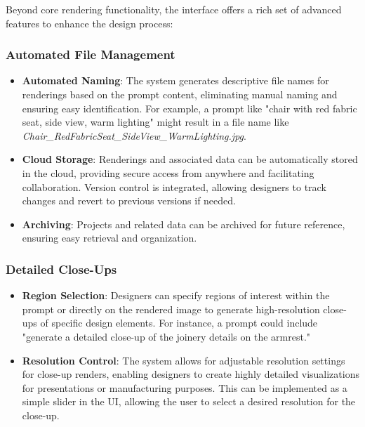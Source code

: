 \documentclass[12pt]{report}
\begin{document}
Beyond core rendering functionality, the interface offers a rich set of advanced features to enhance the design process:

\subsubsection{Automated File Management}
\begin{itemize}
\item \textbf{Automated Naming}: The system generates descriptive file names for renderings based on the prompt content, eliminating manual naming and ensuring easy identification. For example, a prompt like "chair with red fabric seat, side view, warm lighting" might result in a file name like \textit{Chair\_RedFabricSeat\_SideView\_WarmLighting.jpg}.
\item \textbf{Cloud Storage}: Renderings and associated data can be automatically stored in the cloud, providing secure access from anywhere and facilitating collaboration. Version control is integrated, allowing designers to track changes and revert to previous versions if needed.
\item \textbf{Archiving}: Projects and related data can be archived for future reference, ensuring easy retrieval and organization.
\end{itemize}

\subsubsection{Detailed Close-Ups}
\begin{itemize}
\item \textbf{Region Selection}: Designers can specify regions of interest within the prompt or directly on the rendered image to generate high-resolution close-ups of specific design elements. For instance, a prompt could include "generate a detailed close-up of the joinery details on the armrest."
\item \textbf{Resolution Control}: The system allows for adjustable resolution settings for close-up renders, enabling designers to create highly detailed visualizations for presentations or manufacturing purposes. This can be implemented as a simple slider in the UI, allowing the user to select a desired resolution for the close-up.
\end{itemize}
\end{document}
